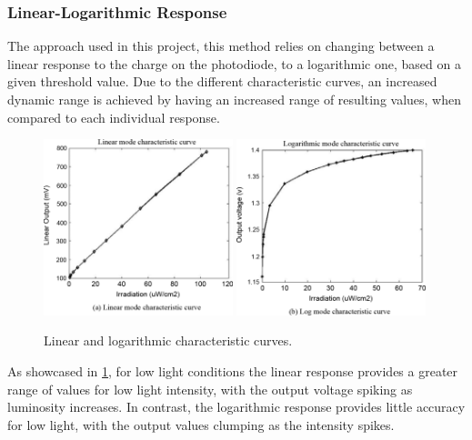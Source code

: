 \subsubsection{Linear-Logarithmic Response}

The approach used in this project, this method relies on changing between a linear response to the charge on
the photodiode, to a logarithmic one, based on a given threshold value. Due to the different characteristic
curves, an increased dynamic range is achieved by having an increased range of resulting values, when compared
to each individual response.

\begin{figure}[H]
    \includegraphics[width=0.49\textwidth, height=0.50\textwidth]{resources/png/linGraph.png}
    \includegraphics[width=0.49\textwidth, height=0.50\textwidth]{resources/png/logGraph.png}
    \caption{Linear and logarithmic characteristic curves. \cite{withScience} \label{figCurves}}
\end{figure}

As showcased in \ref{figCurves}, for low light conditions the linear response provides a greater range of values
for low light intensity, with the output voltage spiking as luminosity increases. In contrast, the logarithmic
response provides little accuracy for low light, with the output values clumping as the intensity spikes.

